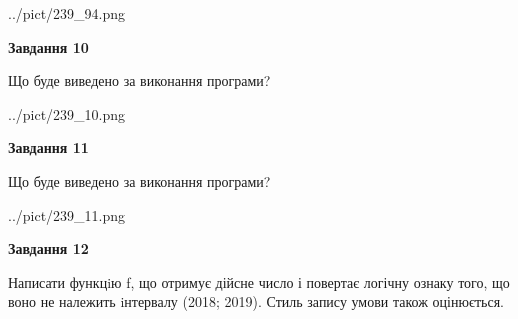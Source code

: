 \documentclass[12pt, ukrainian]{article}
\begin{document}
{\begin {large}
\begin{center}
	{../pict/239_94.png}
\end{center}
\newpage

{\begin {center}\textbf{Завдання 10}\end {center}}

Що буде виведено за виконання програми?\par
\begin{center}
	{../pict/239_10.png}
\end{center}
\newpage

{\begin {center}\textbf{Завдання 11}\end {center}}

Що буде виведено за виконання програми?\par
\begin{center}
	{../pict/239_11.png}
\end{center}
\newpage

{\begin {center}\textbf{Завдання 12}\end {center}}


Написати функцiю f, що отримує дійсне число і повертає логічну ознаку того, що воно не належить iнтервалу (2018; 2019). Стиль запису умови також оцінюється.\par
\newpage

\end {large}}
\end{document}
